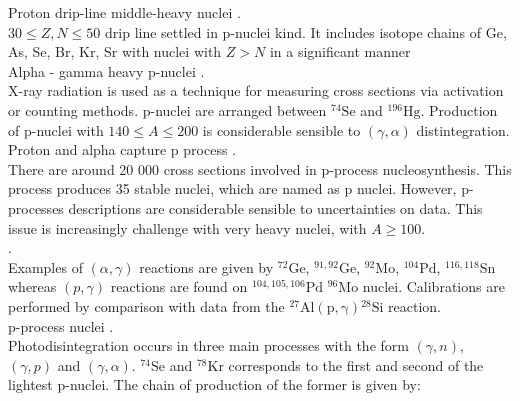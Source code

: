 \documentclass[openany]{book}
\begin{document}
Proton drip-line middle-heavy nuclei \cite{cai_chen_yuan_jian-jun_2022}. \\

$30 \le Z, N \le 50$ drip line settled in p-nuclei kind.  It includes isotope chains of Ge, As, Se, Br, Kr, Sr with nuclei with $Z > N$
in a significant manner\\

Alpha - gamma heavy p-nuclei \cite{kiss_szucs_gyurky_fulop_farkas_kertesz_somorjai_laubenstein_frohlich_rauscher_et_2011}. \\

X-ray radiation is used as a technique for measuring cross sections via activation or counting methods. p-nuclei are arranged between $\mathrm{{}^{74}Se}$ and $\mathrm{{}^{196}Hg}$. Production of p-nuclei with $140 \le A \le 200$ is considerable sensible to $(\gamma, \alpha)$ distintegration. \\

Proton and alpha capture p process \cite{harissopulos_lagoyannis_spyrou_zarkadas_galanopoulos_perdikakis_becker_rolfs_strieder_kunz_et_2005}. \\

There are around 20 000 cross sections involved in p-process nucleosynthesis. This process produces 35 stable nuclei, which are named as p nuclei. However, p-processes descriptions are considerable sensible to uncertainties on data. This issue is increasingly challenge with very heavy nuclei, with $A \ge 100$. \\

\cite{harissopulos_spyrou_lagoyannis_zarkadas_becker_rolfs_strieder_hammer_dewald_zell_et_2005}. \\

Examples of $(\alpha, \gamma)$ reactions are given by $\mathrm{{}^{72}Ge}$, $\mathrm{{}^{91,92}Ge}$, $\mathrm{{}^{92}Mo}$, $\mathrm{{}^{104}Pd}$, $\mathrm{{}^{116,118}Sn}$ whereas $(p, \gamma)$ reactions are found on $\mathrm{{}^{104,105,106}Pd}$  $\mathrm{{}^{96}Mo}$ nuclei. Calibrations are performed by comparison with data from the $\mathrm{{}^{27}Al(p, \gamma){}^{28}Si}$ reaction. \\

p-process nuclei 
\cite{quinn_spyrou_simon_battaglia_couder_deyoung_dombos_fang_gosrres_kontos_et_2013}. \\

Photodisintegration occurs in three main processes with the form $(\gamma, n)$, $(\gamma, p)$ and $(\gamma, \alpha).$ $\mathrm{{}^{74}Se}$ and $\mathrm{{}^{78}Kr}$ corresponds to the first and second of the lightest p-nuclei. The chain of production of the former is given by: 
\end{document}
